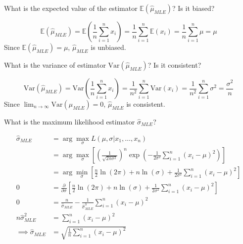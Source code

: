 \documentclass{article}
\newcommand{\E}{\mathbb{E}}
\newcommand{\V}{\text{Var}}
\begin{document}
\begin{probset}
\begin{prob}
\begin{subprobset}
    \newpage

    \begin{subprob}
        What is the expected value of the estimator $\E (\hat{\mu}_{MLE})$? Is it biased?

        \begin{soln}
            \[
                \E (\hat{\mu}_{MLE}) = \E \left(\frac{1}{n} \sum_{i=1}^n x_i\right) = \frac{1}{n} \sum_{i=1}^n \E (x_i) = \frac{1}{n} \sum_{i=1}^n \mu = \mu
            \]
            Since $\E (\hat{\mu}_{MLE}) = \mu$, $\hat{\mu}_{MLE}$ is unbiased.
        \end{soln}
    \end{subprob}

    \begin{subprob}
        What is the variance of estimator $\V(\hat{\mu}_{MLE})$? Is it consistent?

        \begin{soln}
            \[
                \V(\hat{\mu}_{MLE}) = \V\left(\frac{1}{n} \sum_{i=1}^n x_i\right) = \frac{1}{n^2} \sum_{i=1}^n \V(x_i) = \frac{1}{n^2} \sum_{i=1}^n \sigma^2 = \frac{\sigma^2}{n}
            \]
            Since $\lim_{n \to \infty} \V(\hat{\mu}_{MLE}) = 0$, $\hat{\mu}_{MLE}$ is consistent.
        \end{soln}
    \end{subprob}

    \begin{subprob}
        What is the maximum likelihood estimator $\hat{\sigma}_{MLE}$?

        \begin{soln}
            \begin{align*}
                \hat{\sigma}_{MLE} &= \arg\max_{\sigma} L(\mu, \sigma | x_1, \dots, x_n) \\
                &= \arg\max_{\sigma} \left[ \left(\frac{1}{\sqrt{2\pi\sigma^2}}\right)^n \exp\left(-\frac{1}{2\sigma^2} \sum_{i=1}^n (x_i - \mu)^2\right) \right] \\
                &= \arg\min_{\sigma} \left[ \frac{n}{2}\ln(2\pi) + n\ln(\sigma) + \frac{1}{2\sigma^2} \sum_{i=1}^n (x_i - \mu)^2 \right] \\
                0 &= \frac{\partial}{\partial \sigma} \left[ \frac{n}{2}\ln(2\pi) + n\ln(\sigma) + \frac{1}{2\sigma^2} \sum_{i=1}^n (x_i - \mu)^2 \right] \\
                0 &= \frac{n}{\hat{\sigma}_{MLE}} - \frac{1}{\hat{\sigma}_{MLE}^3} \sum_{i=1}^n (x_i - \mu)^2 \\
                n\hat{\sigma}_{MLE}^2 &= \sum_{i=1}^n (x_i - \mu)^2 \\
                \implies \hat{\sigma}_{MLE} &= \sqrt{\frac{1}{n} \sum_{i=1}^n (x_i - \mu)^2}
            \end{align*}
        \end{soln}
    \end{subprob}
\end{subprobset}
\end{prob}


\end{probset}
\end{document}
